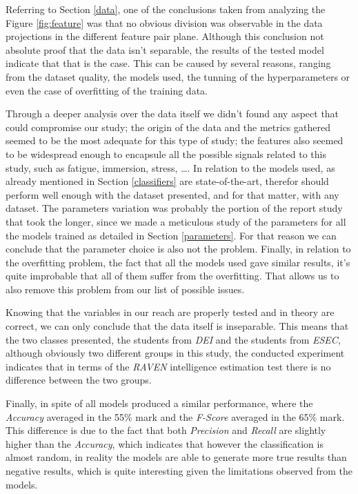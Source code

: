 \documentclass[conference]{IEEEtran}
\begin{document}
Referring to Section \ref{data}, one of the conclusions taken from analyzing the Figure \ref{fig:feature} was that no obvious division was observable in the data projections in the different feature pair plane. Although this conclusion not absolute proof that the data isn't separable, the results of the tested model indicate that that is the case. This can be caused by several reasons, ranging from the dataset quality, the models used, the tunning of the hyperparameters or even the case of overfitting of the training data. 

Through a deeper analysis over the data itself we didn't found any aspect that could compromise our study; the origin of the data and the metrics gathered seemed to be the most adequate for this type of study; the features also seemed to be widespread enough to encapsule all the possible signals related to this study, such as fatigue, immersion, stress, \dots. In relation to the models used, as already mentioned in Section \ref{classifiers} are state-of-the-art, therefor should perform well enough with the dataset presented, and for that matter, with any dataset. The parameters variation was probably the portion of the report study that took the longer, since we made a meticulous study of the parameters for all the models trained as detailed in Section \ref{parameters}. For that reason we can conclude that the parameter choice is also not the problem. Finally, in relation to the overfitting problem, the fact that all the models used gave similar results, it's quite improbable that all of them suffer from the overfitting. That allows us to also remove this problem from our list of possible issues.

Knowing that the variables in our reach are properly tested and in theory are correct, we can only conclude that the data itself is inseparable. This means that the two classes presented, the students from \textit{DEI} and the students from \textit{ESEC}, although obviously two different groups in this study, the conducted experiment indicates that in terms of the \textit{RAVEN} intelligence estimation test there is no difference between the two groups.

Finally, in spite of all models produced a similar performance, where the \textit{Accuracy} averaged in the 55\% mark and the \textit{F-Score} averaged in the 65\% mark. This difference is due to the fact that both \textit{Precision} and \textit{Recall} are slightly higher than the \textit{Accuracy}, which indicates that however the classification is almost random, in reality the models are able to generate more true results than negative results, which is quite interesting given the limitations observed from the models.
\end{document}
